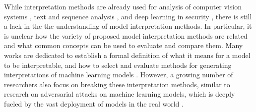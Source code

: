 


While interpretation methods are already used for analysis of computer vision systems \cite{bach2015pixel, simonyan2013deep, zeiler2014visualizing}, text and sequence analysis \cite{ancona2017towards, arras2017relevant}, and deep learning in security \cite{evaluating_explanations_security}, there is still a lack in the the understanding of model interpretation methods. 
In particular, it is unclear how the variety of proposed model interpretation methods are related and what common concepts can be used to evaluate and compare them. Many works are dedicated to establish a formal definition of what it means for a model to be interpretable, and how to select and evaluate methods for generating interpretations of machine learning models \cite{murdoch2019definitions, lipton2018mythos}. However, a growing number of researchers also focus on breaking these interpretation methods, similar to research on adversarial attacks on machine learning models, which is deeply fueled by the vast deployment of models in the real world \cite{fooling_nn_interpreters,ghorbani2019interpretation,dimanov2020you,dombrowski2019explanations,advlime_aies20, le2020remote, zhang2020interpretable, kuppa2020black, anders2020fairwashing, lakkaraju2020fool, kindermans2017reliability}.



